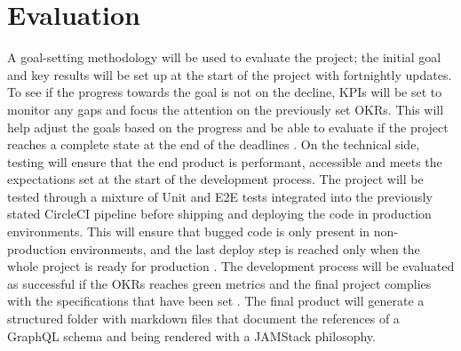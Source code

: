 \section*{Evaluation}
\label{s:Evaluation}
A goal-setting methodology will be used to evaluate the project; the initial
goal and key results will be set up at the start of the project with fortnightly
updates. To see if the progress towards the goal is not on the decline, KPIs
will be set to monitor any gaps and focus the attention on the previously set
OKRs. This will help adjust the goals based on the progress and be able to
evaluate if the project reaches a complete state at the end of the deadlines
\citep{helmoldLeanManagementKPI2020}. On the technical side, testing will ensure
that the end product is performant, accessible and meets the expectations set at
the start of the development process. The project will be tested through a
mixture of Unit and E2E tests integrated into the previously stated CircleCI
pipeline before shipping and deploying the code in production environments. This
will ensure that bugged code is only present in non-production environments, and
the last deploy step is reached only when the whole project is ready for
production \citep{yuUtilisingCIEnvironment2020}. The development process will be
evaluated as successful if the OKRs reaches green metrics and the final project
complies with the specifications that have been set
\citep{helmoldLeanManagementKPI2020}. The final product will generate a
structured folder with markdown files that document the references of a GraphQL
schema and being rendered with a JAMStack philosophy.


